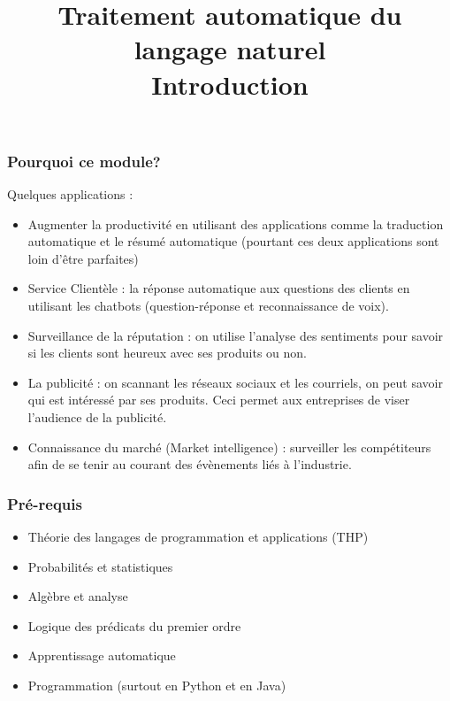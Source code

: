 \documentclass{beamer}
\title[TALN : Introduction] %
{Traitement automatique du langage naturel \\Introduction}
\begin{document}
\begin{frame}
\frametitle{Pourquoi ce module?}

Quelques applications :
\begin{itemize}
	\item Augmenter la productivité en utilisant des applications comme la traduction automatique et le résumé automatique (pourtant ces deux applications sont loin d'être parfaites)

	\item Service Clientèle : la réponse automatique aux questions des clients en utilisant les chatbots (question-réponse et reconnaissance de voix). 

	\item Surveillance de la réputation : on utilise l'analyse des sentiments pour savoir si les clients sont heureux avec ses produits ou non. 

	\item La publicité : on scannant les réseaux sociaux et les courriels, on peut savoir qui est intéressé par ses produits. Ceci permet aux entreprises de viser l'audience de la publicité. 

	\item Connaissance du marché (Market intelligence) : surveiller les compétiteurs afin de se tenir au courant des évènements liés à l'industrie.
\end{itemize}

\end{frame}


\begin{frame}
\frametitle{Pré-requis}

\begin{itemize}
	\item Théorie des langages de programmation et applications (THP)
	\item Probabilités et statistiques
	\item Algèbre et analyse 
	\item Logique des prédicats du premier ordre
	\item Apprentissage automatique 
	\item Programmation (surtout en Python et en Java)
\end{itemize}

\end{frame}
\end{document}

